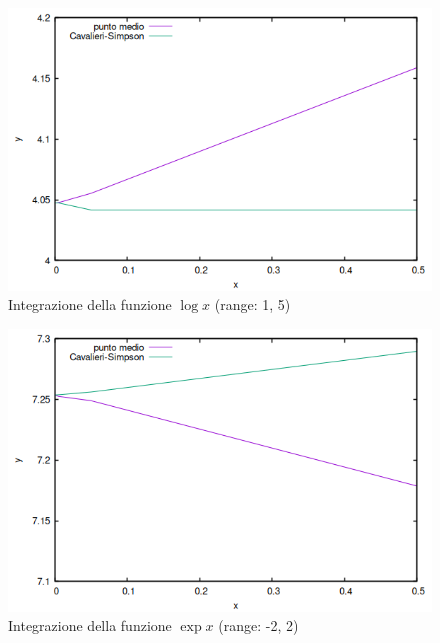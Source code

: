 \documentclass{article}
\begin{document}
\begin{figure}[ht]
   \centering
   \includegraphics*[scale=.5]{../grafici/immagini/log_integrazione.png}
   \caption{Integrazione della funzione $\log x$ (range: 1, 5)}
\end{figure}
\begin{figure}[ht]
   \centering
   \includegraphics*[scale=.5]{../grafici/immagini/exp_integrazione.png}
   \caption{Integrazione della funzione $\exp x$ (range: -2, 2)}
\end{figure}
\end{document}
